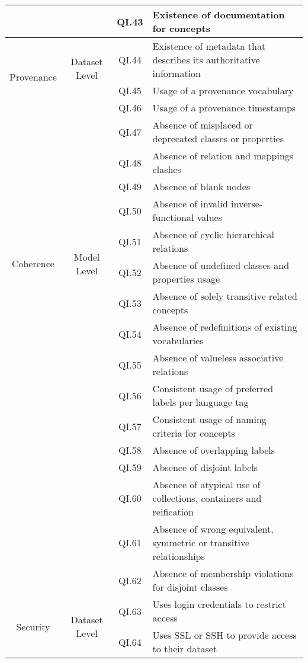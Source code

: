 \documentclass[onecolumn, crcready]{iosart2c}
\begin{document}
\begin{center}
{\begin{longtable}[h]{|c|c|c|l|}
 \cline{3-4}
 & & QI.43 & Existence of documentation for concepts \cite{Mader2012}\cite{DBLP:conf/ic3k/KeetSP13}\tabularnewline
\hline
\hline
\multirow{3}{*}{Provenance} & \multirow{2}{*}{Dataset Level} & QI.44 & Existence of metadata that describes its authoritative information  \cite{Flouris2012}\tabularnewline
\cline{3-4}
 &  & QI.45 & Usage of a provenance vocabulary\tabularnewline
 \cline{3-4}
 &  & QI.46 & Usage of a provenance timestamps\tabularnewline
\hline
\hline
\multirow{10}{*}{Coherence} & \multirow{10}{*}{Model Level} & QI.47 & Absence of misplaced or deprecated classes or properties  \cite{Hogan2010}\tabularnewline
\cline{3-4}
 &  & QI.48 & Absence of relation and mappings clashes  \cite{Suominen:2012:IQS:2413941.2413985}\tabularnewline
\cline{3-4}
 &  & QI.49 & Absence of blank nodes \cite{Hogan:2012:ESL:2263498.2264570}\tabularnewline
\cline{3-4}
 &  & QI.50 & Absence of invalid inverse-functional values \cite{Hogan2010}\tabularnewline
\cline{3-4}
 &  & QI.51 & Absence of cyclic hierarchical relations \cite{conf/jcdl/Soergel05}\cite{Suominen:2012:IQS:2413941.2413985}\cite{Mader2012}\tabularnewline
\cline{3-4}
 &  & QI.52 & Absence of undefined classes and properties usage \cite{Hogan2010}\tabularnewline
\cline{3-4}
 &  & QI.53 & Absence of solely transitive related concepts \cite{Mader2012}\tabularnewline
\cline{3-4}
 &  & QI.54 & Absence of redefinitions of existing vocabularies  \cite{Hogan2010}\tabularnewline
\cline{3-4}
 &  & QI.55 & Absence of valueless associative relations  \cite{Mader2012}\tabularnewline
\hline
\hline
\multirow{7}{*}{Consistency}
 & \multirow{7}{*}{Model Level}
& QI.56 & Consistent usage of preferred labels per language tag \cite{skosprimer}\cite{Mader2012}\tabularnewline
 \cline{3-4}
 & & QI.57 & Consistent usage of naming criteria for concepts \cite{DBLP:conf/ic3k/KeetSP13}\tabularnewline
\cline{3-4}
 &  & QI.58 & Absence of overlapping labels\tabularnewline
\cline{3-4}
 &  & QI.59 & Absence of disjoint labels \cite{Mader2012}\tabularnewline
\cline{3-4}
 & & QI.60 & Absence of atypical use of collections, containers and reification \cite{Hogan2010}\tabularnewline
\cline{3-4}
 &  & QI.61 & Absence of wrong equivalent, symmetric or transitive relationships \cite{DBLP:conf/ic3k/KeetSP13}\tabularnewline
\cline{3-4}
 &  & QI.62 & Absence of membership violations for disjoint classes \cite{Hogan2010}\tabularnewline
\hline
\hline
\multirow{2}{*}{Security} & \multirow{2}{*}{Dataset Level} & QI.63 & Uses login credentials to restrict access \cite{Framework2012}\tabularnewline
\cline{3-4}
 &  & QI.64 & Uses SSL or SSH to provide access to their dataset \cite{Framework2012}\tabularnewline
\hline
\end{longtable}
}
\end{center}
\end{document}
